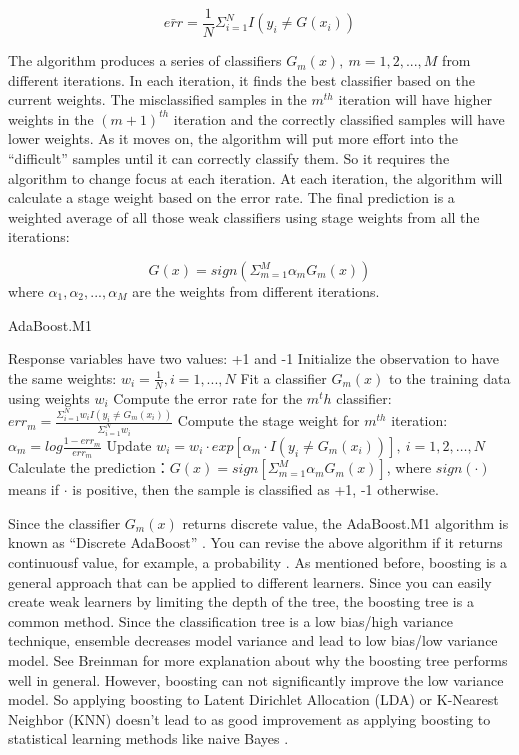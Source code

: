 \documentclass[12pt,]{krantz}
\begin{document}
\[\bar{err}=\frac{1}{N}\Sigma_{i=1}^NI(y_i\neq G(x_i))\]

The algorithm produces a series of classifiers \(G_m(x),\ m=1,2,...,M\) from different iterations. In each iteration, it finds the best classifier based on the current weights. The misclassified samples in the \(m^{th}\) iteration will have higher weights in the \((m+1)^{th}\) iteration and the correctly classified samples will have lower weights. As it moves on, the algorithm will put more effort into the ``difficult'' samples until it can correctly classify them. So it requires the algorithm to change focus at each iteration. At each iteration, the algorithm will calculate a stage weight based on the error rate. The final prediction is a weighted average of all those weak classifiers using stage weights from all the iterations:

\[G(x)=sign ( \Sigma_{m=1}^M \alpha_{m}G_m(x))\]
where \(\alpha_1,\alpha_2,...,\alpha_M\) are the weights from different iterations.

\begin{algorithm}
\caption{AdaBoost.M1}\label{AdaBoostM1algorithm} 
\begin{algorithmic}[1] 
\State Response variables have two values: +1 and -1
\State Initialize the observation to have the same weights:  $w_i=\frac{1}{N},i=1,...,N$
    \State Fit a classifier $G_m(x)$ to the training data using weights $w_i$
    \State Compute the error rate for the $m^th$ classifier: $err_m=\frac{\Sigma_{i=1}^Nw_i I(y_i\neq G_m(x_i))}{\Sigma_{i=1}^Nw_i}$
    \State Compute the stage weight for $m^{th}$ iteration: $\alpha_m=log\frac{1-err_m}{err_m}$
    \State Update $w_i = w_i\cdot exp[\alpha_m\cdot I(y_i \neq G_m(x_i))],\ i=1,2,\dots,N$
\EndFor
\State Calculate the prediction：$G(x)=sign[\Sigma_{m=1}^M\alpha_mG_m(x)]$, where $sign(\cdot)$ means if $\cdot$ is positive, then the sample is classified as +1, -1 otherwise.
\end{algorithmic}
\end{algorithm}

Since the classifier \(G_m(x)\) returns discrete value, the AdaBoost.M1 algorithm is known as ``Discrete AdaBoost'' \citep{Friedman2000}. You can revise the above algorithm if it returns continuousf value, for example, a probability \citep{Friedman2000}. As mentioned before, boosting is a general approach that can be applied to different learners. Since you can easily create weak learners by limiting the depth of the tree, the boosting tree is a common method. Since the classification tree is a low bias/high variance technique, ensemble decreases model variance and lead to low bias/low variance model. See Breinman \citep{Breiman1998} for more explanation about why the boosting tree performs well in general. However, boosting can not significantly improve the low variance model. So applying boosting to Latent Dirichlet Allocation (LDA) or K-Nearest Neighbor (KNN) doesn't lead to as good improvement as applying boosting to statistical learning methods like naive Bayes \citep{Bauer1999}.
\end{document}
